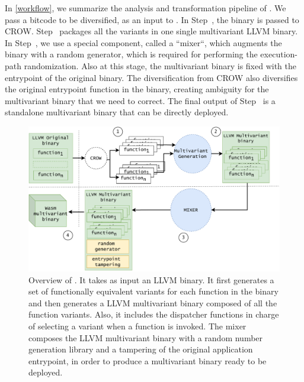 In \autoref{workflow}, we summarize the analysis and transformation pipeline of \tool.
We pass a bitcode to be diversified, as an input to \tool.
In Step~, the binary is passed to CROW. 
Step~ packages all the variants in one single multivariant LLVM binary. 
In Step~, we use a special component, called a ``mixer``,  which augments the binary with a random generator, which is required for performing the execution-path randomization. 
Also at this stage, the multivariant binary is fixed with the entrypoint of the original binary. The diversification from CROW also diversifies the original entrypoint function in the binary, creating ambiguity for the multivariant binary that we need to correct. 
The final output of Step~ is a standalone multivariant \wasm binary that can be directly deployed. 


\begin{figure}
  \centering
  \includegraphics[width=\linewidth]{diagrams/MEWE.pdf}
  \caption{Overview of \tool. It takes as input an LLVM binary. It first generates a set of functionally equivalent variants for each function in the binary and then generates a LLVM multivariant binary composed of all the function variants. Also, it includes the dispatcher functions in charge of selecting a variant when a function is invoked. The \tool mixer composes the LLVM multivariant binary with a random number generation library and a tampering of the original application entrypoint, in order to produce a \wasm multivariant binary ready to be deployed. }
  \label{workflow}
\end{figure}

